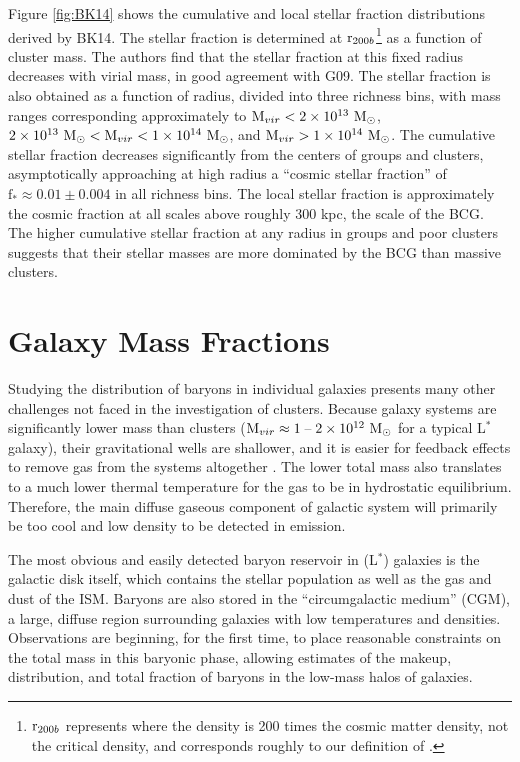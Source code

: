Figure \ref{fig:BK14} shows the cumulative and local stellar fraction
distributions derived by BK14. The stellar fraction is determined at
$\textrm{r}{}_{200b}$\footnote{$\textrm{r}{}_{200b}$ represents where the
  density is 200 times the cosmic matter density, not the critical
  density, and corresponds roughly to our definition of \rvir{}.} as a
function of cluster mass. The authors find that the stellar fraction
at this fixed radius decreases with virial mass, in good agreement with
G09. The stellar fraction is also obtained as a function of radius,
divided into three richness bins, with mass ranges corresponding
approximately to $\textrm{M\ensuremath{_{vir}}}{}< 2\times 10^{13}~\textrm{M}_\odot$, $2\times 10^{13}~\textrm{M}_\odot{} <
\textrm{M\ensuremath{_{vir}}}{} < 1\times 10^{14}~\textrm{M}_\odot{}$, and $\textrm{M\ensuremath{_{vir}}}{}>1\times 10^{14}~\textrm{M}_\odot{}$. The
cumulative stellar fraction decreases significantly from the centers
of groups and clusters, asymptotically approaching at high radius a
``cosmic stellar fraction'' of $\textrm{f}_{*} \approx 0.01 \pm 0.004$
in all richness bins. The local stellar fraction is approximately the
cosmic fraction at all scales above roughly $300$ kpc, the scale of
the BCG. The higher cumulative stellar fraction at any radius in
groups and poor clusters suggests that their stellar masses are more
dominated by the BCG than massive clusters.



\section{Galaxy Mass Fractions}
\label{sec:Galaxy}

Studying the distribution of baryons in individual galaxies presents
many other challenges not faced in the investigation of
clusters. Because galaxy systems are significantly lower mass than
clusters ($\textrm{M\ensuremath{_{vir}}} \approx 1\;\textrm{--}\;2\times 10^{12}~\textrm{M}_\odot{}$ for a typical
L$^*$ galaxy), their gravitational wells are shallower, and it is
easier for feedback effects to remove gas from the systems altogether
. The lower total mass also translates to a
much lower thermal temperature for the gas to be in hydrostatic
equilibrium. Therefore, the main diffuse gaseous component of galactic system
will primarily be too cool and low density to be detected in
emission. 

The most obvious and easily detected baryon reservoir in (L$^*$)
galaxies is the galactic disk itself, which contains the stellar
population as well as the gas and dust of the ISM. Baryons are also
stored in the ``circumgalactic medium'' (CGM), a large, diffuse region
surrounding galaxies with low temperatures and densities. Observations
are beginning, for the first time, to place reasonable constraints on
the total mass in this baryonic phase, allowing estimates of the
makeup, distribution, and total fraction of baryons in the low-mass
halos of galaxies.

